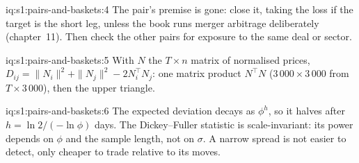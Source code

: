 \begin{solution}{iq:s1:pairs-and-baskets:4}
The pair's premise is gone: close it, taking the loss if the target is the short leg, unless the book runs merger arbitrage deliberately (chapter~11). Then
check the other pairs for exposure to the same deal or sector.
\end{solution}

\begin{solution}{iq:s1:pairs-and-baskets:5}
With $N$ the $T \times n$ matrix of normalised prices, $D_{ij} = \|N_i\|^2 + \|N_j\|^2 - 2 N_i^\top N_j$: one matrix product $N^\top N$ ($3\,000 \times
3\,000$ from $T \times 3\,000$), then the upper triangle.
\end{solution}

\begin{solution}{iq:s1:pairs-and-baskets:6}
The expected deviation decays as $\phi^h$, so it halves after $h = \ln 2/(-\ln\phi)$ days. The Dickey--Fuller statistic is scale-invariant: its power
depends on $\phi$ and the sample length, not on $\sigma$. A narrow spread is not easier to detect, only cheaper to trade relative to its moves.
\end{solution}
